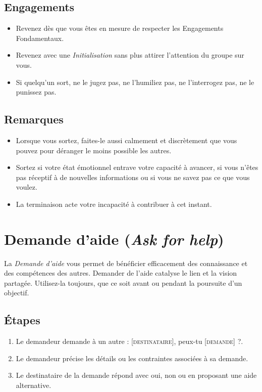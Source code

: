 \documentclass{book}
\begin{document}
\subsection{Engagements}
\begin{itemize}
	\item Revenez dès que vous êtes en mesure de respecter les Engagements Fondamentaux.
	\item Revenez avec une \emph{Initialisation} sans plus attirer l'attention du groupe sur vous.
	\item Si quelqu'un sort, ne le jugez pas, ne l'humiliez pas, ne l'interrogez pas, ne le punissez pas. 
\end{itemize}

\subsection{Remarques}
\begin{itemize}
	\item Lorsque vous sortez, faites-le aussi calmement et discrètement que vous pouvez pour déranger le moins possible les autres.
	\item Sortez si votre état émotionnel entrave votre capacité à avancer, si vous n'êtes pas réceptif à de nouvelles informations ou 
	      si vous ne savez pas ce que vous voulez.
	\item La terminaison acte votre incapacité à contribuer à cet instant.
\end{itemize}

\section{Demande d'aide (\emph{Ask for help})}

La \emph{Demande d'aide} vous permet de bénéficier efficacement des connaissance et des compétences des autres. Demander de l'aide
catalyse le lien et la vision partagée. Utilisez-la toujours, que ce soit avant ou pendant la poursuite d'un objectif. 

\subsection{Étapes}
\begin{enumerate}
	\item Le demandeur demande à un autre : \og{}[\textsc{destinataire}], peux-tu [\textsc{demande}] ?\fg{}.
	\item Le demandeur précise les détails ou les contraintes associées à sa demande.
	\item Le destinataire de la demande répond avec \og{}oui\fg{}, \og{}non\fg{} ou en proposant une aide alternative.
\end{enumerate}
\end{document}
